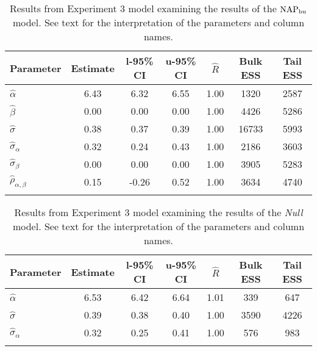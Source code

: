 \begin{table}

\caption{Results from Experiment 3 model examining the results of the $\operatorname{NAP}_{\text{bu}}$ model. \label{tab:Experiment 3-NAPbu}See text for the interpretation of the parameters and column names.}

\begin{tabular}{l *3{S[table-format=-1.2]} S[table-format=1.2] *2{S[table-format=5.0]}}
\lsptoprule
Parameter & {Estimate} & {l-95\% CI} & {u-95\% CI} & {$\hat{R}$} & {Bulk ESS} & {Tail ESS}\\
\midrule
$\hat\alpha$ & 6.43 & 6.32 & 6.55 & 1.00 & 1320 & 2587\\
$\hat\beta$ & 0.00 & 0.00 & 0.00 & 1.00 & 4426 & 5286\\
$\hat\sigma$ & 0.38 & 0.37 & 0.39 & 1.00 & 16733 & 5993\\
$\hat\sigma_{\alpha}$ & 0.32 & 0.24 & 0.43 & 1.00 & 2186 & 3603\\
$\hat\sigma_{\beta}$ & 0.00 & 0.00 & 0.00 & 1.00 & 3905 & 5283\\
$\hat\rho_{\alpha,\beta}$ & 0.15 & -0.26 & 0.52 & 1.00 & 3634 & 4740\\
\lspbottomrule
\end{tabular}

\end{table}






\begin{table}

\caption{Results from Experiment 3 model examining the results of the \textit{Null} model. \label{tab:Experiment 3-null}See text for the interpretation of the parameters and column names.}

\begin{tabular}{l *3{S[table-format=-1.2]} S[table-format=1.2] *2{S[table-format=5.0]}}
\lsptoprule
Parameter & {Estimate} & {l-95\% CI} & {u-95\% CI} & {$\hat{R}$} & {Bulk ESS} & {Tail ESS}\\
\midrule
$\hat\alpha$ & 6.53 & 6.42 & 6.64 & 1.01 & 339 & 647\\
$\hat\sigma$ & 0.39 & 0.38 & 0.40 & 1.00 & 3590 & 4226\\
$\hat\sigma_{\alpha}$ & 0.32 & 0.25 & 0.41 & 1.00 & 576 & 983\\
\lspbottomrule
\end{tabular}

\end{table}






